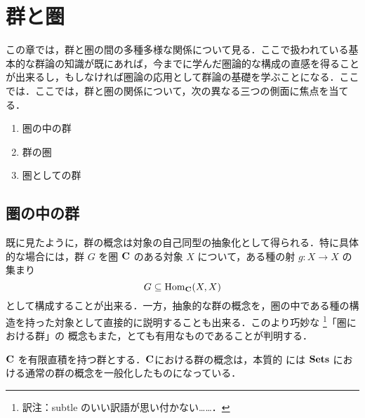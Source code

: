 \chapter{群と圏}
この章では，群と圏の間の多種多様な関係について見る．ここで扱われている基
本的な群論の知識が既にあれば，今までに学んだ圏論的な構成の直感を得ること
が出来るし，もしなければ圏論の応用として群論の基礎を学ぶことになる．ここ
では．ここでは，群と圏の関係について，次の異なる三つの側面に焦点を当てる．

\begin{enumerate}
 \item 圏の中の群
 \item 群の圏
 \item 圏としての群
\end{enumerate}

\section{圏の中の群}
既に見たように，群の概念は対象の自己同型の抽象化として得られる．特に具体
的な場合には，群 $G$ を圏 ${\bf C}$ のある対象 $X$ について，ある種の射
$g: X \to X$ の集まり
\[
 G \subseteq \mathrm{Hom}_{\bf C}(X, X)
\]
として構成することが出来る．一方，抽象的な群の概念を，圏の中である種の構
造を持った対象として直接的に説明することも出来る．このより巧妙な
\footnote{訳注：subtle のいい訳語が思い付かない……．}「圏における群」の
概念もまた，とても有用なものであることが判明する．

${\bf C}$ を有限直積を持つ群とする．${\bf C}$における群の概念は，本質的
には $\mathbf{Sets}$ における通常の群の概念を一般化したものになっている．

